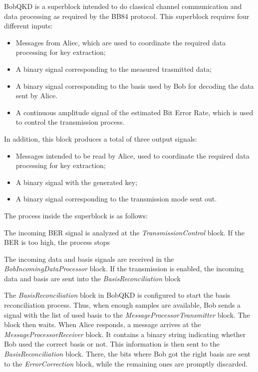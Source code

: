 BobQKD is a superblock intended to do classical channel communication and 
data processing  as required by the BB84 protocol. This superblock requires 
four different inputs:

\begin{itemize}
	\item Messages from Aliec, which are used to coordinate the required data 
	processing for key extraction;
	\item A binary signal corresponding to the measured trasmitted data;
	\item A binary signal corresponding to the basis used by Bob for 
	decoding the data sent by Alice.
	\item A continuous amplitude signal of the estimated Bit Error Rate, which is 
	used to control the transmission process. 
\end{itemize}

In addition, this block produces a total of three output signals:

\begin{itemize}
	\item	Messages intended to be read by Alice, used to coordinate the required 
	data processing for key extraction;
	\item A binary signal with the generated key;
	\item A binary signal corresponding to the transmission mode sent out.
\end{itemize}

The process inside the superblock is as follows:

The incoming BER signal is analyzed at the \textit{TransmissionControl} block. 
If the BER is too high, the process stops

The incoming data and basis signals are received in the 
\textit{BobIncomingDataProcessor} block. If the transmission is enabled, the 
incoming data and basis are sent into the \textit{BasisReconciliation} block


The \textit{BasisReconciliation} block in BobQKD is configured to start the 
basis reconciliation process. Thus, when enough samples are available, Bob 
sends a signal with the list of used basis to the 
\textit{MessageProcessorTransmitter} block. The block then waits.
When Alice responds, a message arrives at the \textit{MessageProcessorReceiver} 
block. It contains a binary string indicating whether Bob used the correct 
basis or not. This information is then sent to the \textit{BasisReconciliation} 
block. There, the bits where Bob got the right basis are sent to the 
\textit{ErrorCorrection} block, while the remaining ones are promptly discarded.


